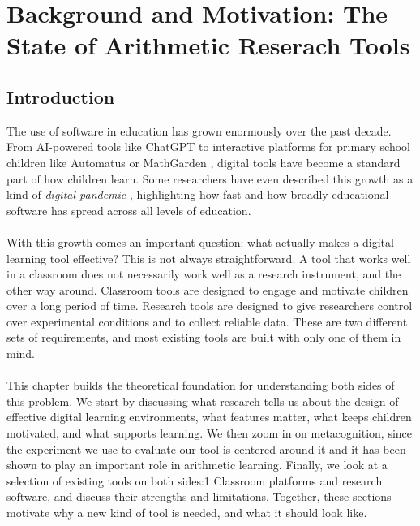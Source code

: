 \chapter{Background and Motivation: The State of Arithmetic Reserach Tools}



\section{Introduction}

The use of software in education has grown enormously over the past decade.
From AI-powered tools like ChatGPT to interactive platforms for primary school
children like Automatus \cite{automatus} or MathGarden \cite{rekentuin}, digital
tools have become a standard part of how children learn. Some researchers have
even described this growth as a kind of \textit{digital pandemic}
\cite{dancsa_digital_2023}, highlighting how fast and how broadly educational
software has spread across all levels of education. \\ \\
With this growth comes an important question: what actually makes a digital
learning tool effective? This is not always straightforward. A tool that works
well in a classroom does not necessarily work well as a research instrument, and
the other way around. Classroom tools are designed to engage and motivate
children over a long period of time. Research tools are designed to give
researchers control over experimental conditions and to collect reliable data.
These are two different sets of requirements, and most existing tools are built
with only one of them in mind. \\ \\
This chapter builds the theoretical foundation for understanding both sides of
this problem. We start by discussing what research tells us about the design of
effective digital learning environments, what features matter, what keeps
children motivated, and what supports learning. We then zoom in on metacognition,
since the experiment we use to evaluate our tool is centered around it and it
has been shown to play an important role in arithmetic learning. Finally, we
look at a selection of existing tools on both sides:1 Classroom platforms and
research software, and discuss their strengths and limitations. Together,
these sections motivate why a new kind of tool is needed, and what it should
look like.

